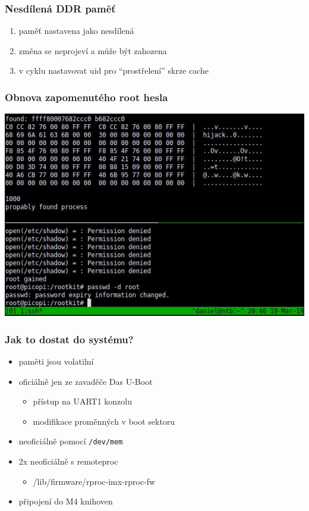 \documentclass{beamer}
\begin{document}
\begin{frame}
\frametitle{Nesdílená DDR paměť}
\begin{enumerate}
	\item paměť nastavena jako nesdílená
	\item změna se neprojeví a může být zahozena
	\item v cyklu nastavovat uid pro ``prostřelení'' skrze cache
\end{enumerate}
\end{frame}

\begin{frame}
\frametitle{Obnova zapomenutého root hesla}
\includegraphics[width=\linewidth]{figures/demo.jpg}
\end{frame}




\begin{frame}
\frametitle{Jak to dostat do systému?}
\begin{itemize}
	\item paměti jsou volatilní
	\item oficiálně jen ze zavaděče Das U-Boot
		\begin{itemize}
			\item přístup na UART1 konzolu
			\item modifikace proměnných v boot sektoru
		\end{itemize}
	\item neoficiálně pomocí \texttt{/dev/mem}
	\item 2x neoficiálně s remoteproc
		\begin{itemize}
			\item /lib/firmware/rproc-imx-rproc-fw
		\end{itemize}
	\item připojení do M4 knihoven
\end{itemize}
\end{frame}
\end{document}

